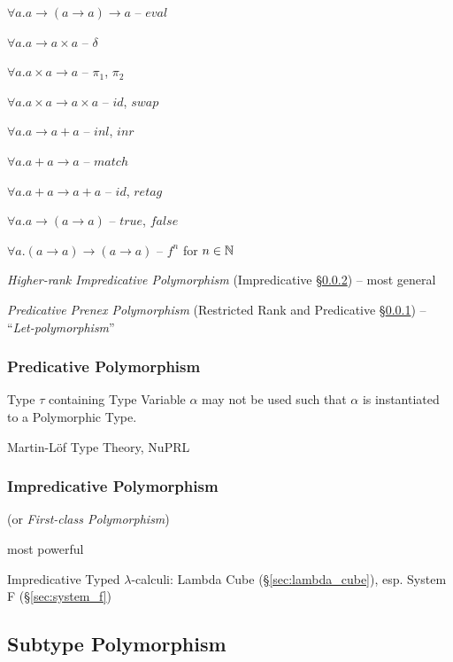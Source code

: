 $\forall a.a \rightarrow (a \rightarrow a) \rightarrow a$ -- $eval$


$\forall a.a \rightarrow a \times a$ -- $\delta$

$\forall a.a \times a \rightarrow a$ -- $\pi_1$, $\pi_2$

$\forall a.a \times a \rightarrow a \times a$ -- $id$, $swap$


$\forall a.a \rightarrow a + a$ -- $inl$, $inr$

$\forall a.a + a \rightarrow a$ -- $match$

$\forall a.a + a \rightarrow a + a$ -- $id$, $retag$


$\forall a.a \rightarrow (a \rightarrow a)$ -- $true$, $false$


$\forall a.(a \rightarrow a) \rightarrow (a \rightarrow a)$ -- $f^n$
for $n \in \mathbb{N}$


\asterism


\emph{Higher-rank Impredicative Polymorphism} (Impredicative
\S\ref{sec:impredicative_polymorphism}) -- most general

\emph{Predicative Prenex Polymorphism} (Restricted Rank and
Predicative \S\ref{sec:predicative_polymorphism}) --
``\emph{Let-polymorphism}''



\subsubsection{Predicative Polymorphism}
\label{sec:predicative_polymorphism}

Type $\tau$ containing Type Variable $\alpha$ may not be used such
that $\alpha$ is instantiated to a Polymorphic Type.

Martin-L\"of Type Theory, NuPRL



\subsubsection{Impredicative Polymorphism}
\label{sec:impredicative_polymorphism}

(or \emph{First-class Polymorphism})

most powerful

Impredicative Typed $\lambda$-calculi: Lambda Cube
(\S\ref{sec:lambda_cube}), esp. System F (\S\ref{sec:system_f})



\subsection{Subtype Polymorphism}\label{sec:subtype_polymorphism}

